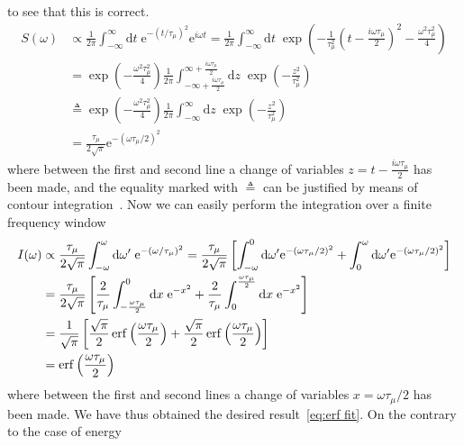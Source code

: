 to see that this is correct.
\begin{align}
  S(\omega) &\propto \frac{1}{2\pi} \int_{-\infty}^{\infty} \mathrm{d}t \; \mathrm{e}^{-(t/\tau_{\mu})^2}
  \mathrm{e}^{i\omega t} = \frac{1}{2\pi} \int_{-\infty}^{\infty} \mathrm{d}t \; 
  \exp\left(-\frac{1}{\tau_{\mu}^2} \left(t-\frac{i\omega\tau_{\mu}}{2}\right)^2 
  - \frac{\omega^2\tau_{\mu}^2}{4}\right) \nonumber \\
  &= \exp\left(- \frac{\omega^2\tau_{\mu}^2}{4}\right) \frac{1}{2\pi}
  \int_{-\infty+\frac{i\omega\tau_{\mu}}{2}}^{\infty+\frac{i\omega\tau_{\mu}}{2}} 
  \mathrm{d} z\; \exp\left(-\frac{z^2}{\tau_{\mu}^2}\right) \nonumber\\
  & \triangleq \exp\left(- \frac{\omega^2
  \tau_{\mu}^2}{4}\right) \frac{1}{2\pi} \int_{-\infty}^{\infty}
  \mathrm{d} z\; \exp\left(-\frac{z^2}{\tau_{\mu}^2}\right) \nonumber  \\
  &= \frac{\tau_{\mu}}{2\sqrt{\pi}}\mathrm{e}^{-(\omega \tau_{\mu}/2)^2}
\end{align}
where between the first and second line a change of variables \(z = t-\frac{i \omega \tau_{\mu}}{2}\)
has been made, and the equality marked with \(\triangleq\) can be justified by means of contour
integration~\autocite{Stein2010}. 
Now we can easily perform the integration over a finite
frequency window
\begin{align}
  I(\omega) &\propto \frac{\tau_{\mu}}{2\sqrt{\pi}}\int_{-\omega}^{\omega} \mathrm{d}\omega^{\prime}\;
  \mathrm{e}^{-(\omega/\tau_{\mu})^2} = \frac{\tau_{\mu}}{2\sqrt{\pi}}
  \left[\int_{-\omega}^{0} \mathrm{d}\omega^{\prime} \mathrm{e}^{-(\omega\tau_{\mu}/2)^2} + 
  \int_{0}^{\omega} \mathrm{d}\omega^{\prime} \mathrm{e}^{-(\omega\tau_{\mu}/2)^2} \right]\nonumber\\
  &= \frac{\tau_{\mu}}{2\sqrt{\pi}} \left[ \frac{2}{\tau_{\mu}}\int_{-\frac{\omega\tau_{\mu}}{2}}^{0} 
  \mathrm{d} x\;  \mathrm{e}^{-x^2} + \frac{2}{\tau_{\mu}}\int_{0}^{\frac{\omega\tau_{\mu}}{2}}
   \mathrm{d}x\; \mathrm{e}^{-x^2} \right]\nonumber\\ 
   &= \frac{1}{\sqrt{\pi}} \left[ \frac{\sqrt{\pi}}{2} \erf\left(\frac{\omega\tau_{\mu}}{2}\right) +
   \frac{\sqrt{\pi}}{2} \erf\left(\frac{\omega\tau_{\mu}}{2}\right) \right]\nonumber\\
    &= \erf\left(\frac{\omega\tau_{\mu}}{2}\right)
\end{align}
where between the first and second lines a change of variables \(x=\omega\tau_{\mu}/2\) has been made.
We have thus obtained the desired result~\eqref{eq:erf fit}. On the contrary to the case of energy
